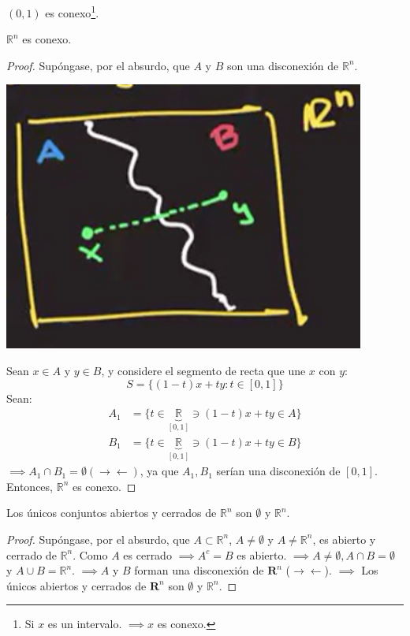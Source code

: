 \begin{corolario}
$(0,1)$ es conexo\footnote{Si $x$ es un intervalo. $\implies x$ es conexo.}. 
\end{corolario}

\begin{teorema}
	$\mathbb{R}^n$ es conexo.
	\begin{proof}
		Supóngase, por el absurdo, que $A$ y $B$ son una disconexión de $\mathbb{R}^n$. 
		\begin{center}
			\includegraphics[scale=0.4]{images/2/21}
		\end{center}
		Sean $x\in A$ y $y\in B$, y considere el segmento de recta que une $x$ con $y$: 
		$$S=\{(1-t)x+ty:t\in[0,1]\}$$
		Sean: 
		\begin{align*}
			A_1 &= \{t\in \underbrace{\mathbb{R}}_{[0,1]}\ni (1-t)x+ty\in A\}\\
			B_1 &= \{t\in \underbrace{\mathbb{R}}_{[0,1]}\ni (1-t)x+ty\in B\}
		\end{align*}
	$\implies A_1\cap B_1 =\emptyset (\to\gets)$, ya que $A_1,B_1$ serían una disconexión de $[0,1]$. Entonces, $\mathbb{R}^n$ es conexo. 
	\end{proof}
\end{teorema}

\begin{teorema}
	Los únicos conjuntos abiertos y cerrados de $\mathbb{R}^n$ son $\emptyset$ y $\mathbb{R}^n$. 
	\begin{proof}
		Supóngase, por el absurdo, que $A\subset \mathbb{R}^n$, $A\neq \emptyset$ y $A\neq \mathbb{R}^n$, es abierto y cerrado de $\mathbb{R}^n$. Como $A$ es cerrado $\implies A^c=B$ es abierto. $\implies A\neq \emptyset, A\cap B=\emptyset$ y $A\cup B=\mathbb{R}^n$. $\implies A$ y $B$ forman una disconexión de $\mathbf{R}^n$ ($\to\gets$). $\implies$ Los únicos abiertos y cerrados de $\mathbf{R}^n$ son $\emptyset$ y $\mathbb{R}^n$. 
	\end{proof}
\end{teorema}

